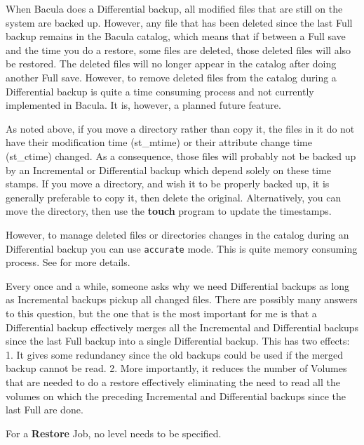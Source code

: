 \begin{description}
\begin{description}
   When Bacula does a Differential backup, all modified files that are
   still on the system are backed up.  However, any file that has been
   deleted since the last Full backup remains in the Bacula catalog, which
   means that if between a Full save and the time you do a restore, some
   files are deleted, those deleted files will also be restored.  The
   deleted files will no longer appear in the catalog after doing another
   Full save.  However, to remove deleted files from the catalog during a
   Differential backup is quite a time consuming process and not currently
   implemented in Bacula.  It is, however, a planned future feature.

   As noted above, if you move a directory rather than copy it, the
   files in it do not have their modification time (st\_mtime) or
   their attribute change time (st\_ctime) changed.  As a
   consequence, those files will probably not be backed up by an
   Incremental or Differential backup which depend solely on these
   time stamps.  If you move a directory, and wish it to be
   properly backed up, it is generally preferable to copy it, then
   delete the original. Alternatively, you can move the directory, then
   use the {\bf touch} program to update the timestamps.

   However, to manage deleted files or directories changes in the
   catalog during an Differential backup you can use \texttt{accurate}
   mode. This is quite memory consuming process. See  for more details.

   Every once and a while, someone asks why we need Differential
   backups as long as Incremental backups pickup all changed files.
   There are possibly many answers to this question, but the one
   that is the most important for me is that a Differential backup
   effectively merges
   all the Incremental and Differential backups since the last Full backup
   into a single Differential backup.  This has two effects: 1.  It gives
   some redundancy since the old backups could be used if the merged backup
   cannot be read.  2.  More importantly, it reduces the number of Volumes
   that are needed to do a restore effectively eliminating the need to read
   all the volumes on which the preceding Incremental and Differential
   backups since the last Full are done.

\end{description}

For a {\bf Restore} Job, no level needs to be specified.  


\end{description}
